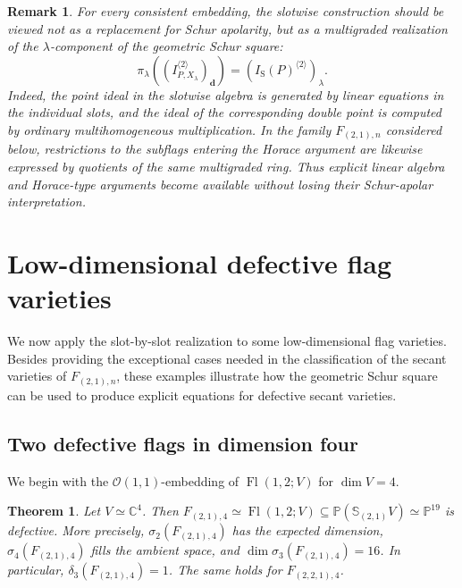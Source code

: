 \documentclass[a4paper,reqno]{amsart}
\theoremstyle{plainnopunct}
\newtheorem{theorem}{Theorem}[section]
\theoremstyle{definitionnopunct}
\newtheorem{remark}[remark]{Remark}
\newcommand{\C}{\mathbb{C}}
\renewcommand{\P}{\mathbb{P}}
\renewcommand{\S}{\mathbb{S}}
\newcommand{\cO}{\mathcal{O}}
\newcommand{\bd}{\mathbf{d}}
\DeclareMathOperator{\Fl}{Fl}
\begin{document}
\begin{remark}
\label{rem: computational role slotwise lift}
For every consistent embedding, the slotwise construction should be
viewed not as a replacement for Schur apolarity, but as a
multigraded realization of the $\lambda$-component of the geometric
Schur square:
\[
\pi_\lambda
\left(
\left(
I_{P,X_\lambda}^{\langle2\rangle}
\right)_{\bd}
\right)
=
\left(
I_{\mathrm S}(P)^{\langle2\rangle}
\right)_\lambda.
\]
Indeed, the point ideal in the slotwise algebra is generated by
linear equations in the individual slots, and the ideal of the
corresponding double point is computed by ordinary multihomogeneous
multiplication. In the family $F_{(2,1),n}$ considered below,
restrictions to the subflags entering the Horace argument are
likewise expressed by quotients of the same multigraded ring.
Thus explicit linear algebra and Horace-type arguments become
available without losing their Schur-apolar interpretation.
\end{remark}

\section{Low-dimensional defective flag varieties}
\label{sect: defectiveness}

\noindent We now apply the slot-by-slot realization to some low-dimensional
flag varieties. Besides providing the exceptional cases needed in the
classification of the secant varieties of $F_{(2,1),n}$, these
examples illustrate how the geometric Schur square can be used to
produce explicit equations for defective secant varieties.

\subsection{Two defective flags in dimension four}
We begin with the $\cO(1,1)$-embedding of $\Fl(1,2;V)$ for $\dim V=4$.

\begin{theorem}
\label{thm: def of F124}
Let $V\simeq\C^4$.
Then
$
F_{(2,1),4}
\simeq
\Fl(1,2;V)
\subseteq
\P(\S_{(2,1)}V)
\simeq
\P^{19}$
is defective. More precisely, $\sigma_2(F_{(2,1),4})$ has the
expected dimension, $\sigma_4(F_{(2,1),4})$ fills the ambient space,
and
$\dim\sigma_3(F_{(2,1),4})=16$.
In particular,
$
\delta_3(F_{(2,1),4})=1$.
The same holds for $F_{(2,2,1),4}$.
\end{theorem}
\end{document}
